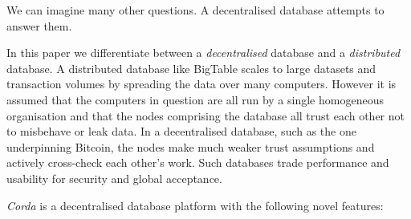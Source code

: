 \documentclass{article}
\begin{document}
We can imagine many other questions. A decentralised database attempts to answer them.

In this paper we differentiate between a \emph{decentralised} database and a \emph{distributed} database. A
distributed database like BigTable\cite{BigTable} scales to large datasets and transaction volumes by spreading the
data over many computers. However it is assumed that the computers in question are all run by a single homogeneous
organisation and that the nodes comprising the database all trust each other not to misbehave or leak data. In a
decentralised database, such as the one underpinning Bitcoin\cite{Bitcoin}, the nodes make much weaker trust
assumptions and actively cross-check each other's work. Such databases trade performance and usability for security
and global acceptance.

\emph{Corda} is a decentralised database platform with the following novel features:
\end{document}
